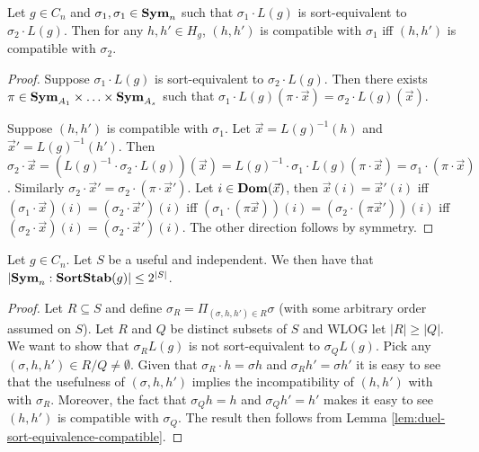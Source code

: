 \documentclass[../paper.tex]{subfiles}
\begin{document}
\begin{lem}
  \label{lem:duel-sort-equivalence-compatible}
  Let $g \in C_n$ and $\sigma_1, \sigma_1 \in \text{\textbf{Sym}}_n$ such that $\sigma_1 \cdot
  L(g)$ is sort-equivalent to $\sigma_2 \cdot L(g)$. Then for any $h,h' \in
  H_g$, $(h,h')$ is compatible with $\sigma_1$ iff $(h,h')$ is compatible with
  $\sigma_2$.
\end{lem}
\begin{proof}
  Suppose $\sigma_1 \cdot L(g)$ is sort-equivalent to $\sigma_2 \cdot L(g)$.
  Then there exists $\pi \in \text{\textbf{Sym}}_{A_1} \times \ldots \times \text{\textbf{Sym}}_{A_s}$ such
  that $\sigma_1 \cdot L(g) (\pi \cdot \vec{x}) = \sigma_2 \cdot L(g)
  (\vec{x})$.

  Suppose $(h, h')$ is compatible with $\sigma_1$. Let $\vec{x} = L(g)^{-1}(h)$
  and $\vec{x}' = L(g)^{-1}(h')$. Then $\sigma_2 \cdot \vec{x} = (L(g)^{-1}
  \cdot \sigma_2 \cdot L(g)) (\vec{x}) = L(g)^{-1} \cdot \sigma_1 \cdot L(g)(\pi
  \cdot \vec{x}) = \sigma_1 \cdot (\pi \cdot \vec{x})$. Similarly $\sigma_2
  \cdot \vec{x}' = \sigma_2 \cdot (\pi \cdot \vec{x}')$. Let $i \in \text{\textbf{Dom}}
  (\vec{x})$, then $\vec{x}(i) = \vec{x}'(i)$ iff $(\sigma_1 \cdot \vec{x})(i) =
  (\sigma_2 \cdot \vec{x}')(i)$ iff $(\sigma_1 \cdot (\pi \vec{x}))(i) =
  (\sigma_2 \cdot (\pi \vec{x}'))(i)$ iff $(\sigma_2 \cdot \vec{x})(i) =
  (\sigma_2 \cdot \vec{x}')(i)$. The other direction follows by symmetry.
\end{proof}


\begin{claim}
  \label{claim:useful-independant-set}
  Let $g \in C_n$. Let $S$ be a useful and independent. We then have that $\vert
  \text{\textbf{Sym}}_n: \text{\textbf{SortStab}}(g) \vert \leq 2^{\vert S \vert}$.
\end{claim}

\begin{proof}
  Let $R \subseteq S$ and define $\sigma_R = \Pi_{(\sigma, h, h') \in R} \sigma$
  (with some arbitrary order assumed on $S$). Let $R$ and $Q$ be distinct
  subsets of $S$ and WLOG let $\vert R \vert \geq \vert Q \vert$. We want to
  show that $\sigma_R L(g)$ is not sort-equivalent to $ \sigma_Q L(g)$. Pick any
  $(\sigma, h, h') \in R/Q \neq \emptyset$. Given that $\sigma_R \cdot h =
  \sigma h$ and $\sigma_R h' = \sigma h'$ it is easy to see that the usefulness
  of $(\sigma, h,h')$ implies the incompatibility of $(h,h')$ with with
  $\sigma_R$. Moreover, the fact that $\sigma_Q h = h$ and $\sigma_Q h' = h'$
  makes it easy to see $(h,h')$ is compatible with $\sigma_Q$. The result then
  follows from Lemma \ref{lem:duel-sort-equivalence-compatible}.

\end{proof}
\end{document}
